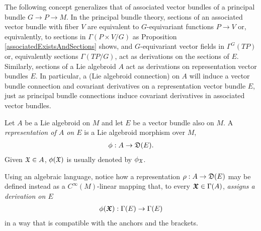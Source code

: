 





\linea

The following concept generalizes that of associated vector bundles of a principal bundle $G \to P \to M$. In the principal bundle theory, sections of an associated vector bundle with fiber $V$ are equivalent to $G$-equivariant functions $P \to V$ or, equivalently, to sections in $\Gamma(P \times V/G)$ as Proposition \ref{associatedExistsAndSections} shows, and $G$-equivariant vector fields in $\Gamma^G(TP)$ or, equivalently sections $\Gamma(TP/G)$, act as derivations on the sections of $E$. %
Similarly, sections of a Lie algebroid $A$ act as derivations on representation vector bundles $E$. In particular, a (Lie algebroid connection) on $A$ will induce a vector bundle connection and covariant derivatives on a representation vector bundle $E$, just as principal bundle connections induce covariant derivatives in associated vector bundles.

\begin{definition}%
Let $A$ be a Lie algebroid on $M$ and let $E$ be a vector bundle also on $M$. A \emph{representation of $A$ on $E$} is a Lie algebroid morphism over $M$,
\begin{align}
    \phi: A \to \alg D(E).
\end{align}
Given $\mathfrak{X} \in A$, $\phi(\oid X)$ is usually denoted by $\phi_{\oid X}$.
\end{definition}
Using an algebraic language, notice how a representation $\rho:A \to \mathfrak{D}(E)$ may be defined instead as a $C^\infty(M)$-linear mapping that, to every $\bm{\mathfrak{X}} \in \Gamma(A)$, \emph{assigns a derivation on $E$} 
\begin{align}
    \phi(\sectoid X): \Gamma(E) \to \Gamma(E)
\end{align}
in a way that is compatible with the anchors and the brackets.

